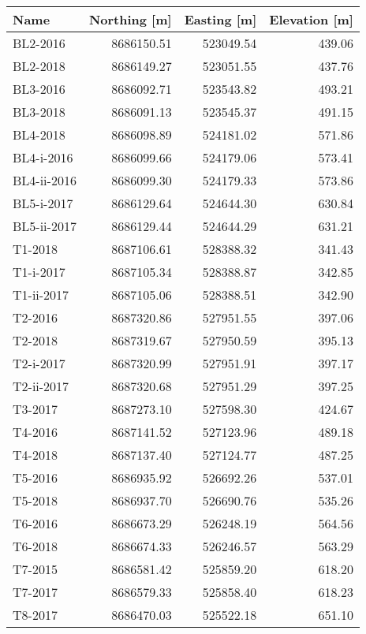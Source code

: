 \begin{tabular}{lrrr}
\toprule
        Name &  Northing [m] &  Easting [m] &  Elevation [m] \\
\midrule
    BL2-2016 &    8686150.51 &    523049.54 &         439.06 \\
    BL2-2018 &    8686149.27 &    523051.55 &         437.76 \\
    BL3-2016 &    8686092.71 &    523543.82 &         493.21 \\
    BL3-2018 &    8686091.13 &    523545.37 &         491.15 \\
    BL4-2018 &    8686098.89 &    524181.02 &         571.86 \\
  BL4-i-2016 &    8686099.66 &    524179.06 &         573.41 \\
 BL4-ii-2016 &    8686099.30 &    524179.33 &         573.86 \\
  BL5-i-2017 &    8686129.64 &    524644.30 &         630.84 \\
 BL5-ii-2017 &    8686129.44 &    524644.29 &         631.21 \\
     T1-2018 &    8687106.61 &    528388.32 &         341.43 \\
   T1-i-2017 &    8687105.34 &    528388.87 &         342.85 \\
  T1-ii-2017 &    8687105.06 &    528388.51 &         342.90 \\
     T2-2016 &    8687320.86 &    527951.55 &         397.06 \\
     T2-2018 &    8687319.67 &    527950.59 &         395.13 \\
   T2-i-2017 &    8687320.99 &    527951.91 &         397.17 \\
  T2-ii-2017 &    8687320.68 &    527951.29 &         397.25 \\
     T3-2017 &    8687273.10 &    527598.30 &         424.67 \\
     T4-2016 &    8687141.52 &    527123.96 &         489.18 \\
     T4-2018 &    8687137.40 &    527124.77 &         487.25 \\
     T5-2016 &    8686935.92 &    526692.26 &         537.01 \\
     T5-2018 &    8686937.70 &    526690.76 &         535.26 \\
     T6-2016 &    8686673.29 &    526248.19 &         564.56 \\
     T6-2018 &    8686674.33 &    526246.57 &         563.29 \\
     T7-2015 &    8686581.42 &    525859.20 &         618.20 \\
     T7-2017 &    8686579.33 &    525858.40 &         618.23 \\
     T8-2017 &    8686470.03 &    525522.18 &         651.10 \\
\bottomrule
\end{tabular}
